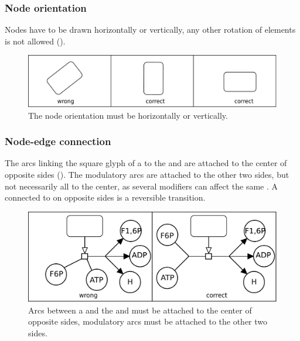 \subsubsection{Node orientation}

Nodes have to be drawn horizontally or vertically, any other
rotation of elements is not allowed ().

\begin{figure}[h!]
  \centering
  \includegraphics[scale=0.3]{images/layout-orientation}
  \caption{The node orientation must be horizontally or
  vertically.}\label{fig:af:layout5}
\end{figure}

\subsubsection{Node-edge connection}

The arcs linking the square glyph of a  
to the  and 
are attached to the center of opposite sides (). 
The modulatory arcs are attached to the other two sides, but not necessarily
all to the center, as several modifiers can affect the same . A  connected to  on opposite
sides is a reversible transition.

\begin{figure}[h!]
  \centering
  \includegraphics[scale=0.3]{images/layout-connecting-arcs}
  \caption{Arcs between a   and the 
   and  must be attached 
  to the center of opposite sides, modulatory
  arcs must be attached to the other two sides.}\label{fig:af:layout6}
\end{figure}

